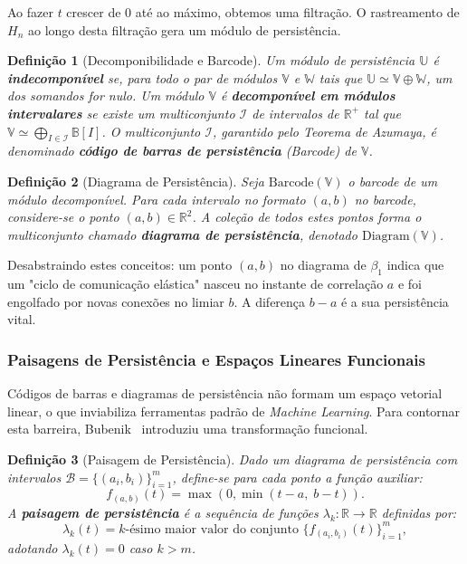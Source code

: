 \documentclass[12pt, a4paper]{article}
\newtheorem{definition}{Definição}
\begin{document}
Ao fazer $t$ crescer de $0$ até ao máximo, obtemos uma filtração. O rastreamento de $H_n$ ao longo desta filtração gera um módulo de persistência.

\begin{definition}[Decomponibilidade e Barcode]
Um módulo de persistência $\mathbb{U}$ é \textbf{indecomponível} se, para todo o par de módulos $\mathbb{V}$ e $\mathbb{W}$ tais que $\mathbb{U} \simeq \mathbb{V} \oplus \mathbb{W}$, um dos somandos for nulo. Um módulo $\mathbb{V}$ é \textbf{decomponível em módulos intervalares} se existe um multiconjunto $\mathcal{I}$ de intervalos de $\mathbb{R}^+$ tal que $\mathbb{V} \simeq \bigoplus_{I \in \mathcal{I}} \mathbb{B}[I]$. O multiconjunto $\mathcal{I}$, garantido pelo Teorema de Azumaya, é denominado \textbf{código de barras de persistência} (\textit{Barcode}) de $\mathbb{V}$.
\end{definition}

\begin{definition}[Diagrama de Persistência]
Seja $\mathrm{Barcode}(\mathbb{V})$ o barcode de um módulo decomponível. Para cada intervalo no formato $(a,b)$ no barcode, considere-se o ponto $(a,b) \in \mathbb{R}^2$. A coleção de todos estes pontos forma o multiconjunto chamado \textbf{diagrama de persistência}, denotado $\mathrm{Diagram}(\mathbb{V})$.
\end{definition}

Desabstraindo estes conceitos: um ponto $(a, b)$ no diagrama de $\beta_1$ indica que um "ciclo de comunicação elástica" nasceu no instante de correlação $a$ e foi engolfado por novas conexões no limiar $b$. A diferença $b - a$ é a sua persistência vital.

\subsubsection{Paisagens de Persistência e Espaços Lineares Funcionais}

Códigos de barras e diagramas de persistência não formam um espaço vetorial linear, o que inviabiliza ferramentas padrão de \textit{Machine Learning}. Para contornar esta barreira, Bubenik~\cite{Bubenik2015} introduziu uma transformação funcional.

\begin{definition}[Paisagem de Persistência]
Dado um diagrama de persistência com intervalos $\mathcal{B} = \{(a_i, b_i)\}_{i=1}^m$, define-se para cada ponto a função auxiliar:
\[
f_{(a,b)}(t) = \max(0, \min(t-a,\; b-t)).
\]
A \textbf{paisagem de persistência} é a sequência de funções $\lambda_k : \mathbb{R} \to \mathbb{R}$ definidas por:
\[
\lambda_k(t) = k\text{-ésimo maior valor do conjunto } \{f_{(a_i,b_i)}(t)\}_{i=1}^m,
\]
adotando $\lambda_k(t) = 0$ caso $k > m$.
\end{definition}
\end{document}
